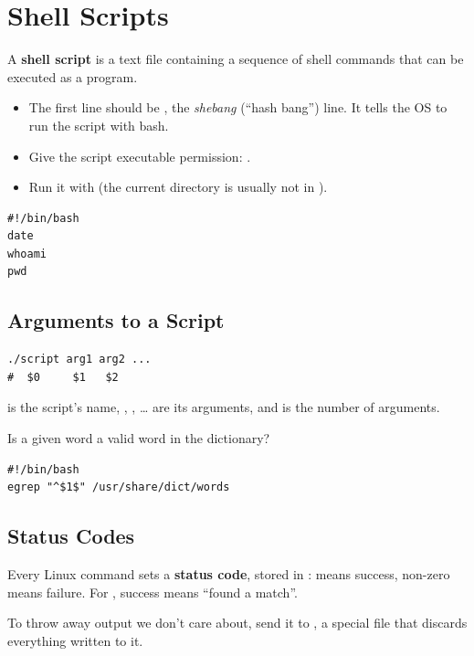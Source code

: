\section{Shell Scripts}
\begin{definition}
A \textbf{shell script} is a text file containing a sequence of shell commands
that can be executed as a program.
\end{definition}
\begin{itemize}
  \item The first line should be , the \emph{shebang} (``hash
        bang'') line. It tells the OS to run the script with bash.
  \item Give the script executable permission: .
  \item Run it with  (the current directory is usually not in
        ).
\end{itemize}

\begin{lstlisting}[style=bash]
#!/bin/bash
date
whoami
pwd
\end{lstlisting}

\subsection{Arguments to a Script}
\begin{lstlisting}[style=bash]
./script arg1 arg2 ...
#  $0     $1   $2
\end{lstlisting}
 is the script's name, , , \dots{} are its arguments,
and \code{\$\#} is the number of arguments.

\begin{example}
Is a given word a valid word in the dictionary?
\begin{lstlisting}[style=bash]
#!/bin/bash
egrep "^$1$" /usr/share/dict/words
\end{lstlisting}
\end{example}

\subsection{Status Codes}
Every Linux command sets a \textbf{status code}, stored in :
 means success, non-zero means failure. For , success means
``found a match''.

\begin{aside}
To throw away output we don't care about, send it to , a special
file that discards everything written to it.
\end{aside}

